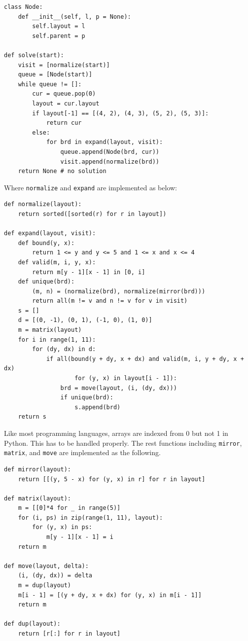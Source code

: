 \documentclass[UTF8]{article}
\begin{document}
\lstset{language=Python}
\begin{lstlisting}
class Node:
    def __init__(self, l, p = None):
        self.layout = l
        self.parent = p

def solve(start):
    visit = [normalize(start)]
    queue = [Node(start)]
    while queue != []:
        cur = queue.pop(0)
        layout = cur.layout
        if layout[-1] == [(4, 2), (4, 3), (5, 2), (5, 3)]:
            return cur
        else:
            for brd in expand(layout, visit):
                queue.append(Node(brd, cur))
                visit.append(normalize(brd))
    return None # no solution
\end{lstlisting}

Where \texttt{normalize} and \texttt{expand} are implemented as below:

\lstset{language=Python}
\begin{lstlisting}
def normalize(layout):
    return sorted([sorted(r) for r in layout])

def expand(layout, visit):
    def bound(y, x):
        return 1 <= y and y <= 5 and 1 <= x and x <= 4
    def valid(m, i, y, x):
        return m[y - 1][x - 1] in [0, i]
    def unique(brd):
        (m, n) = (normalize(brd), normalize(mirror(brd)))
        return all(m != v and n != v for v in visit)
    s = []
    d = [(0, -1), (0, 1), (-1, 0), (1, 0)]
    m = matrix(layout)
    for i in range(1, 11):
        for (dy, dx) in d:
            if all(bound(y + dy, x + dx) and valid(m, i, y + dy, x + dx)
                    for (y, x) in layout[i - 1]):
                brd = move(layout, (i, (dy, dx)))
                if unique(brd):
                    s.append(brd)
    return s
\end{lstlisting}

Like most programming languages, arrays are indexed from 0 but not 1 in Python.
This has to be handled properly. The rest functions including \texttt{mirror},
\texttt{matrix}, and \texttt{move} are implemented as the following.

\lstset{language=Python}
\begin{lstlisting}
def mirror(layout):
    return [[(y, 5 - x) for (y, x) in r] for r in layout]

def matrix(layout):
    m = [[0]*4 for _ in range(5)]
    for (i, ps) in zip(range(1, 11), layout):
        for (y, x) in ps:
            m[y - 1][x - 1] = i
    return m

def move(layout, delta):
    (i, (dy, dx)) = delta
    m = dup(layout)
    m[i - 1] = [(y + dy, x + dx) for (y, x) in m[i - 1]]
    return m

def dup(layout):
    return [r[:] for r in layout]
\end{lstlisting}
\end{document}
